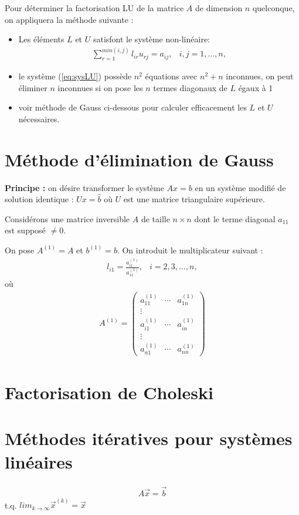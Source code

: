 Pour déterminer la factorisation LU de la matrice $A$ de dimension $n$ quelconque, on appliquera la méthode suivante : 
\begin{itemize}
	\item Les éléments $L$ et $U$ satisfont le système non-linéaire:
	\begin{eqnarray}
		\label{eq:sysLU}
		\sum_{r=1}^{min(i,j)}l_{ir}u_{rj}=a_{ij},&i,j=1,\dots,n,
	\end{eqnarray} 
	\item le système (\ref{eq:sysLU}) possède $n^2$ équations avec $n^2+n$ inconnues, on peut éliminer $n$ inconnues si on pose les $n$ termes diagonaux de $L$ égaux à 1 
	\item voir méthode de Gauss ci-dessous pour calculer efficacement les $L$ et $U$ nécessaires.
\end{itemize}
\section{Méthode d'élimination de Gauss}
\textbf{Principe :} on désire transformer le système $Ax = b$ en un système modifié de solution identique : $Ux=\hat b$
où $U$ est une matrice triangulaire supérieure.

Considérons une matrice inversible $A$ de taille $n\times n$ dont le terme diagonal $a_{11}$ est supposé $\neq 0$.
 
On pose $A^{(1)} = A$ et $b^{(1)} = b$. On introduit le multiplicateur suivant :
\begin{eqnarray}
	l_{i1}=\frac{a_{i1}^{(1)}}{a_{11}^{(1)}},&i=2,3,\dots,n,
\end{eqnarray}
où 
\begin{eqnarray*}
	A^{(1)}=
	\begin{pmatrix}
		a_{11}^{(1)} & \cdots & a_{1n}^{(1)} 
		\\
		\vdots
		\\
		a_{i1}^{(1)} & \cdots & a_{in}^{(1)} 
		\\
		\vdots
		\\
		a_{n1}^{(1)} & \cdots & a_{nn}^{(1)} 
	\end{pmatrix}
\end{eqnarray*}
\section{Factorisation de Choleski}
\section{Méthodes itératives pour systèmes linéaires}
\begin{eqnarray*}
	A\overrightarrow{x}=\overrightarrow b
\end{eqnarray*}
t.q. $lim_{k\rightarrow\infty}\overrightarrow x^{(k)}=\overrightarrow x$

